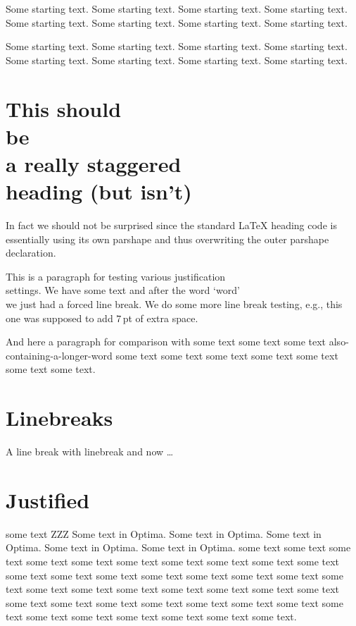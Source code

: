 \documentclass{article}
\begin{document}
Some starting text. Some starting text. Some starting text. Some starting text.
Some starting text. Some starting text. Some starting text. Some starting text.

Some starting text. Some starting text. Some starting text. Some starting text.
Some starting text. Some starting text. Some starting text. Some starting text.

\section{This should\\ be\\a really staggered\\heading (but isn't)}

In fact we should not be surprised since the standard \LaTeX{} heading
code is essentially using its own parshape and thus overwriting the
outer parshape declaration.


This is a paragraph for testing various justification\\ settings. We have some
text and after the word `word' \\ we just had a forced line break. We
do some more line break testing, e.g., this\\[7pt] one was supposed to
add $7$\,pt of extra space.

And here a paragraph for comparison with some text some text some text
also-containing-a-longer-word some text some text some text some text
some text some text some text.

\section{Linebreaks}

A line break with linebreak\linebreak
and now \ldots

\section{Justified}

some text%
\marginpar
  {%
    \fussy
    \fontsize{7}{9}\selectfont
    ZZZ Some text in Optima. Some text in Optima. Some text in Optima.
    Some text in Optima. Some text in Optima.%
  }
some text some text some text some text some text some text some text
some text some text some text some text some text some text
some text some text some text some text some text some text some text
some text some text some text some text some text some text
some text some text some text some text some text some text some text
some text some text some text some text some text some text.
\end{document}
